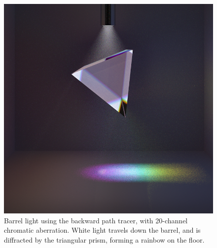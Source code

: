 \documentclass[12pt]{article}
\begin{document}
\begin{figure} 
\centering
  \includegraphics[width = 6 in]{fig11.png}
  \caption{ Barrel light using the backward path tracer, with 20-channel chromatic aberration.
White light travels down the barrel, and is diffracted by the triangular prism, forming a rainbow on the floor.
}
\end{figure}
\end{document}
